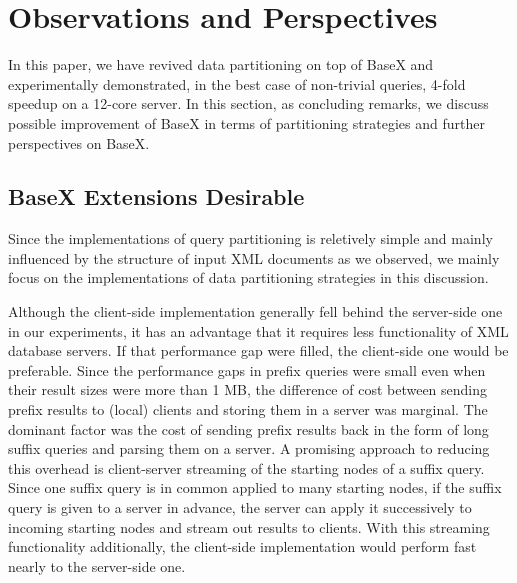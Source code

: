 \section{Observations and Perspectives}
\label{sect:concl}

In this paper, we have revived data partitioning \cite{BoLS09}
on top of BaseX and experimentally demonstrated, in the best case of non-trivial
queries, 4-fold speedup on a 12-core server. In this section, as
concluding remarks, we discuss possible improvement of BaseX in terms of 
partitioning strategies and further perspectives on BaseX.


\subsection{BaseX Extensions Desirable}

Since the implementations of query partitioning is reletively simple and mainly
influenced by the structure of input XML documents as we observed, we mainly
focus on the implementations of data partitioning strategies in this discussion.

Although the client-side implementation generally fell behind the server-side
one in our experiments, it has an advantage that it requires less functionality
of XML database servers. If that performance gap were filled, the client-side
one would be preferable. Since the performance gaps in prefix queries were small
even when their result sizes were more than 1 MB, the difference of cost between
sending prefix results to (local) clients and storing them in a server was
marginal. The dominant factor was the cost of sending prefix results back in the
form of long suffix queries and parsing them on a server.  A promising approach
to reducing this overhead is client-server streaming of the starting nodes of a
suffix query. Since one suffix query is in common applied to many starting
nodes, if the suffix query is given to a server in advance, the server can apply
it successively to incoming starting nodes and stream out results to clients.
With this streaming functionality additionally, the client-side implementation
would perform fast nearly to the server-side one.

